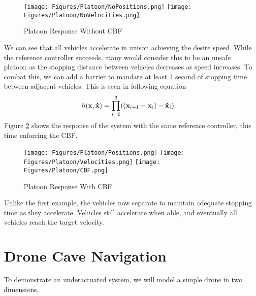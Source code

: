\begin{figure}[H]
    \centering
    \texttt{[image: Figures/Platoon/NoPositions.png]}
    \texttt{[image: Figures/Platoon/NoVelocities.png]}
    \caption{Platoon Response Without CBF}
    \label{fig:platoon_no_cbf}
\end{figure}

\noindent We can see that all vehicles accelerate in unison achieving the desire speed. While the reference controller succeeds, many would consider this to be an unsafe platoon as the stopping distance between vehicles decreases as speed increases. To combat this, we can add a barrier to mandate at least 1 second of stopping time between adjacent vehicles. This is seen in following equation
\begin{align*}
    h({\mathbf{{x}}}, {\mathbf{\dot{x}}}) = \prod_{i = 0}^3 (({\mathbf{{x}}}_{i + 1} - {\mathbf{{x}}}_i) -  {\mathbf{\dot{x}}}_i)
\end{align*}
\noindent Figure \ref{fig:platoon_cbf} shows the response of the system with the same reference controller, this time enforcing the CBF.
\begin{figure}[H]
    \centering
    \texttt{[image: Figures/Platoon/Positions.png]}
    \texttt{[image: Figures/Platoon/Velocities.png]}
    \texttt{[image: Figures/Platoon/CBF.png]}
    \caption{Platoon Response With CBF}
    \label{fig:platoon_cbf}
\end{figure}
\noindent Unlike the first example, the vehicles now separate to maintain adequate stopping time as they accelerate. Vehicles still accelerate when able, and eventually all vehicles reach the target velocity.
\section{Drone Cave Navigation}  \label{sec:drone}

\noindent To demonstrate an underactuated system, we will model a simple drone in two dimensions.


